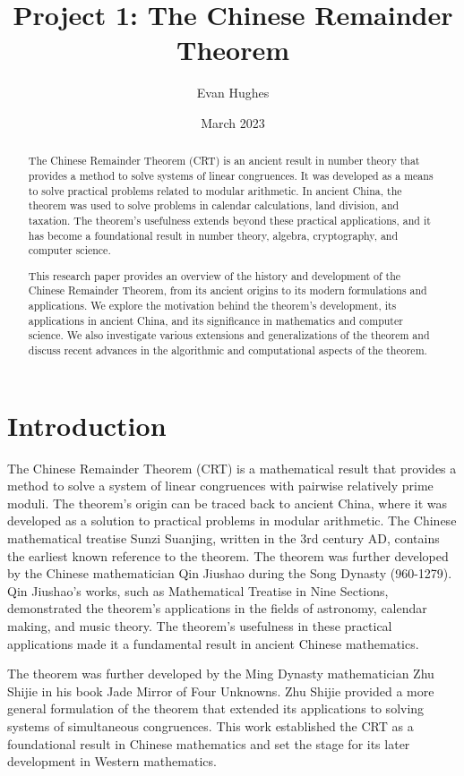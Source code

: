 \documentclass[12pt]{article}
\title{Project 1: The Chinese Remainder Theorem}
\author{Evan Hughes}
\date{March 2023}
\begin{document}
\maketitle
\begin{abstract}
The Chinese Remainder Theorem (CRT) is an ancient result 
in number theory that provides a method to solve systems 
of linear congruences. It was developed as a means to solve 
practical problems related to modular arithmetic. In 
ancient China, the theorem was used to solve problems 
in calendar calculations, land division, and taxation. 
The theorem's usefulness extends beyond these practical 
applications, and it has become a foundational result in 
number theory, algebra, cryptography, and computer science.

This research paper provides an overview of the history 
and development of the Chinese Remainder Theorem, from 
its ancient origins to its modern formulations and 
applications. We explore the motivation behind the theorem's 
development, its applications in ancient China, and its 
significance in mathematics and computer science. We also 
investigate various extensions and generalizations of the 
theorem and discuss recent advances in the algorithmic and 
computational aspects of the theorem.
\end{abstract}

\pagebreak
\section*{Introduction}
The Chinese Remainder Theorem (CRT) is a mathematical result that provides 
a method to solve a system of linear congruences with pairwise relatively 
prime moduli. The theorem's origin can be traced back to ancient China, where 
it was developed as a solution to practical problems in modular arithmetic. 
The Chinese mathematical treatise Sunzi Suanjing, written in the 3rd century 
AD, contains the earliest known reference to the theorem. The theorem was 
further developed by the Chinese mathematician Qin Jiushao during the Song 
Dynasty (960-1279). Qin Jiushao's works, such as Mathematical Treatise in 
Nine Sections, demonstrated the theorem's applications in the fields of 
astronomy, calendar making, and music theory. The theorem's usefulness in 
these practical applications made it a fundamental result in ancient Chinese 
mathematics.

The theorem was further developed by the Ming Dynasty mathematician 
Zhu Shijie in his book Jade Mirror of Four Unknowns. Zhu Shijie provided 
a more general formulation of the theorem that extended its applications 
to solving systems of simultaneous congruences. This work established the 
CRT as a foundational result in Chinese mathematics and set the stage for 
its later development in Western mathematics.
\end{document}
